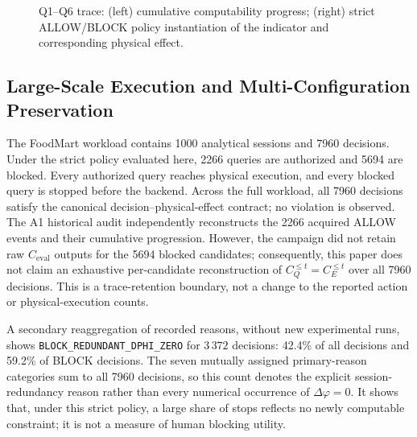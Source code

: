 \documentclass[journal]{IEEEtran}
\begin{document}
\begin{figure}[!t]
\centering
\begin{minipage}[t]{0.49\textwidth}\centering\end{minipage}\hfill
\begin{minipage}[t]{0.49\textwidth}\centering\end{minipage}
\caption{Q1--Q6 trace: (left) cumulative computability progress; (right) strict ALLOW/BLOCK policy instantiation of the indicator and corresponding physical effect.}
\label{fig:decision-trace}
\end{figure}

\subsection{Large-Scale Execution and Multi-Configuration Preservation}

The FoodMart workload contains 1000 analytical sessions and 7960 decisions. Under the strict policy evaluated here, 2266 queries are authorized and 5694 are blocked. Every authorized query reaches physical execution, and every blocked query is stopped before the backend. Across the full workload, all 7960 decisions satisfy the canonical decision--physical-effect contract; no violation is observed. The A1 historical audit independently reconstructs the 2266 acquired ALLOW events and their cumulative progression. However, the campaign did not retain raw $C_{\mathrm{eval}}$ outputs for the 5694 blocked candidates; consequently, this paper does not claim an exhaustive per-candidate reconstruction of $C_Q^{\le t}=C_E^{\le t}$ over all 7960 decisions. This is a trace-retention boundary, not a change to the reported action or physical-execution counts.

A secondary reaggregation of recorded reasons, without new experimental runs, shows \texttt{BLOCK\_REDUNDANT\_DPHI\_ZERO} for $3\,372$ decisions: 42.4\% of all decisions and 59.2\% of BLOCK decisions. The seven mutually assigned primary-reason categories sum to all 7960 decisions, so this count denotes the explicit session-redundancy reason rather than every numerical occurrence of $\Delta\varphi=0$. It shows that, under this strict policy, a large share of stops reflects no newly computable constraint; it is not a measure of human blocking utility.


\end{document}
